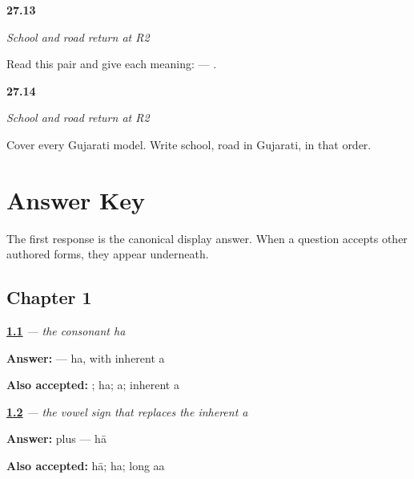 \noindent\begin{minipage}[t]{\linewidth}
\raggedright
\hypertarget{review-GU-R23-shaalaa-rasto-r2-reading}{\textbf{27.13}} \emph{School and road return at R2}\par
\small Read this pair and give each meaning:  — .
\end{minipage}\par\medskip

\noindent\begin{minipage}[t]{\linewidth}
\raggedright
\hypertarget{review-GU-R23-shaalaa-rasto-r2-writing}{\textbf{27.14}} \emph{School and road return at R2}\par
\small Cover every Gujarati model. Write school, road in Gujarati, in that order.
\end{minipage}\par\medskip

\chapter*{Answer Key}

The first response is the canonical display answer. When a question accepts other authored forms, they appear underneath.

\section*{Chapter 1}

\noindent\begin{minipage}[t]{\linewidth}
\raggedright
\hyperlink{review-GU-W01-ha-observe-check}{\textbf{1.1}} \emph{ — the consonant ha}\par
\small \textbf{Answer:}  — ha, with inherent a\par
\footnotesize \textbf{Also accepted:} ; ha; a; inherent a
\end{minipage}\par\medskip

\noindent\begin{minipage}[t]{\linewidth}
\raggedright
\hyperlink{review-GU-W01-aa-matra-observe-check}{\textbf{1.2}} \emph{ — the vowel sign that replaces the inherent a}\par
\small \textbf{Answer:}  plus  — hā\par
\footnotesize \textbf{Also accepted:} hā; ha; long aa
\end{minipage}\par\medskip

